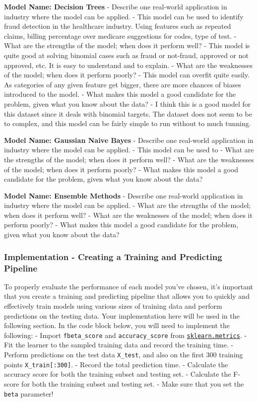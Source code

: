 \documentclass[11pt]{article}
\begin{document}
\textbf{Model Name: Decision Trees} - Describe one real-world
application in industry where the model can be applied. - This model can
be used to identify fraud detection in the healthcare industry. Using
features such as repeated claims, billing percentage over medicare
suggestions for codes, type of test. - What are the strengths of the
model; when does it perform well? - This model is quite good at solving
binomial cases such as fraud or not-fraud, approved or not approved,
etc. It is easy to understand and to explain. - What are the weaknesses
of the model; when does it perform poorly? - This model can overfit
quite easily. As categories of any given feature get bigger, there are
more chances of biases introduced to the model. - What makes this model
a good candidate for the problem, given what you know about the data? -
I think this is a good model for this dataset since it deals with
binomial targets. The dataset does not seem to be to complex, and this
model can be fairly simple to run without to much tunning.

\textbf{Model Name: Gaussian Naive Bayes} - Describe one real-world
application in industry where the model can be applied. - This model can
be used to - What are the strengths of the model; when does it perform
well? - What are the weaknesses of the model; when does it perform
poorly? - What makes this model a good candidate for the problem, given
what you know about the data?

\textbf{Model Name: Ensemble Methods} - Describe one real-world
application in industry where the model can be applied. - What are the
strengths of the model; when does it perform well? - What are the
weaknesses of the model; when does it perform poorly? - What makes this
model a good candidate for the problem, given what you know about the
data?

    \subsubsection{Implementation - Creating a Training and Predicting
Pipeline}\label{implementation---creating-a-training-and-predicting-pipeline}

To properly evaluate the performance of each model you've chosen, it's
important that you create a training and predicting pipeline that allows
you to quickly and effectively train models using various sizes of
training data and perform predictions on the testing data. Your
implementation here will be used in the following section. In the code
block below, you will need to implement the following: - Import
\texttt{fbeta\_score} and \texttt{accuracy\_score} from
\href{http://scikit-learn.org/stable/modules/classes.html\#sklearn-metrics-metrics}{\texttt{sklearn.metrics}}.
- Fit the learner to the sampled training data and record the training
time. - Perform predictions on the test data \texttt{X\_test}, and also
on the first 300 training points \texttt{X\_train{[}:300{]}}. - Record
the total prediction time. - Calculate the accuracy score for both the
training subset and testing set. - Calculate the F-score for both the
training subset and testing set. - Make sure that you set the
\texttt{beta} parameter!
\end{document}
